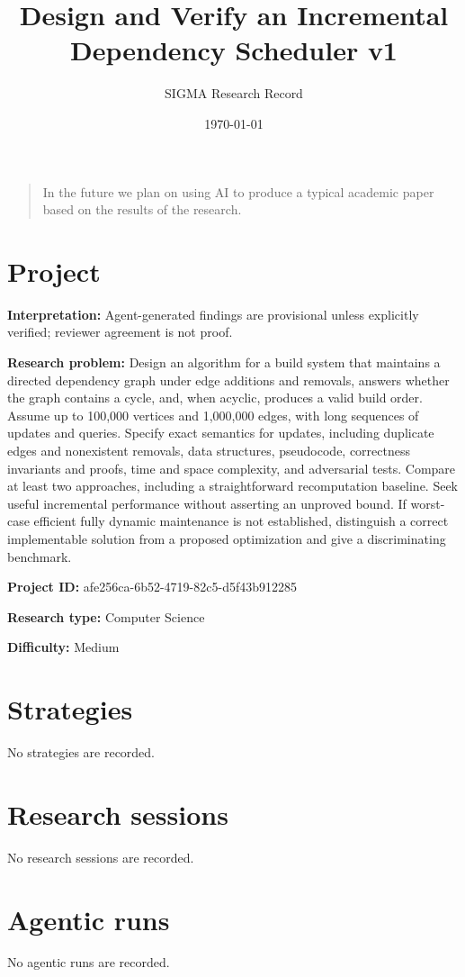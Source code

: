 \documentclass[11pt]{article}
\title{Design and Verify an Incremental Dependency Scheduler v1}
\author{SIGMA Research Record}
\date{\today}
\begin{document}
\maketitle
\begin{quote}\small In the future we plan on using AI to produce a typical academic paper based on the results of the research.\end{quote}
\section{Project}
\textbf{Interpretation:} Agent-generated findings are provisional unless explicitly verified; reviewer agreement is not proof.\par
\textbf{Research problem:} Design an algorithm for a build system that maintains a directed dependency graph under edge additions and removals, answers whether the graph contains a cycle, and, when acyclic, produces a valid build order. Assume up to 100,000 vertices and 1,000,000 edges, with long sequences of updates and queries. Specify exact semantics for updates, including duplicate edges and nonexistent removals, data structures, pseudocode, correctness invariants and proofs, time and space complexity, and adversarial tests. Compare at least two approaches, including a straightforward recomputation baseline. Seek useful incremental performance without asserting an unproved bound. If worst-case efficient fully dynamic maintenance is not established, distinguish a correct implementable solution from a proposed optimization and give a discriminating benchmark.\par
\textbf{Project ID:} afe256ca-6b52-4719-82c5-d5f43b912285\par
\textbf{Research type:} Computer Science\par
\textbf{Difficulty:} Medium\par
\section{Strategies}
No strategies are recorded.\par
\section{Research sessions}
No research sessions are recorded.\par
\section{Agentic runs}
No agentic runs are recorded.\par
\end{document}
